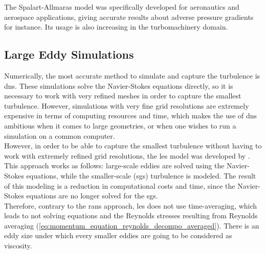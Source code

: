\documentclass[12pt,twoside]{report}
\begin{document}
The Spalart-Allmaras model was specifically developed for aeronautics and aerospace applications, giving accurate results about adverse pressure gradients for instance. Its usage is also increasing in the turbomachinery domain.

\vspace{0.3cm}











\subsection{Large Eddy Simulations}
Numerically, the most accurate method to simulate and capture the turbulence is \gls{dns}. These simulations solve the Navier-Stokes equations directly, so it is necessary to work with very refined meshes in order to capture the smallest turbulence. However, simulations with very fine grid resolutions are extremely expensive in terms of computing resources and time, which makes the use of \gls{dns} ambitious when it comes to large geometries, or when one wishes to run a simulation on a common computer. \\

However, in order to be able to capture the smallest turbulence without having to work with extremely refined grid resolutions, the \gls{les} model was developed by \cite{smagorinsky_general_1963}. This approach works as follows: large-scale eddies are solved using the Navier-Stokes equations, while the  smaller-scale (\gls{sgs}) turbulence is modeled. The result of this modeling is a reduction in computational costs and time, since the Navier-Stokes equations are no longer solved for the \gls{sgs}.\\

Therefore, contrary to the \gls{rans} approach, \gls{les} does not use time-averaging, which leads to not solving equations and the Reynolds stresses resulting from Reynolds averaging (\autoref{eq:momentum_equation_reynolds_decompo_averaged}). There is an eddy size under which every smaller eddies are going to be considered as viscosity. 
\end{document}
